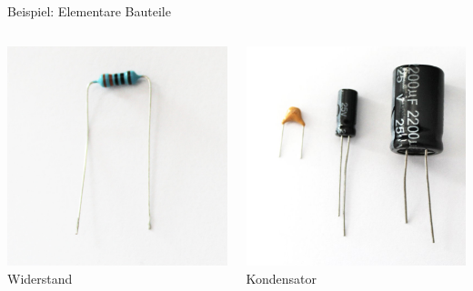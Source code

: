 {
\small

\begin{frame}{Beispiel: Elementare Bauteile}
    \begin{columns}
        \includegraphics[width=.8\textwidth]{2-hardwaredesign/img/komponenten_elementar_widerstand} \\
        Widerstand

        \includegraphics[width=.8\textwidth]{2-hardwaredesign/img/komponenten_elementar_kondensator} \\
        Kondensator


\end{columns}
\end{frame}}
